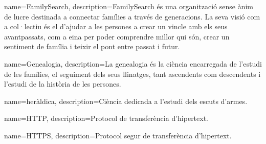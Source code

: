 {
	name=FamilySearch,
	description={FamilySearch és una organització sense ànim de lucre destinada a connectar famílies a través de generacions. La seva visió com a col·lectiu és el d'ajudar a les persones a crear un vincle amb els seus avantpassats, com a eina per poder comprendre millor qui són, crear un sentiment de família i teixir el pont entre passat i futur.}
}

{
	name=Genealogia,
	description={La genealogia és la ciència encarregada de l’estudi de les famílies, el seguiment dels seus llinatges, tant ascendents com descendents i l’estudi de la història de les persones.}
}

{
	name=heràldica,
	description={Ciència dedicada a l'estudi dels escuts d'armes.}
}

 {
	name=HTTP,
	description={Protocol de transferència d'hipertext.}
}

 {
	name=HTTPS,
	description={Protocol segur de transferència d'hipertext.}
}

